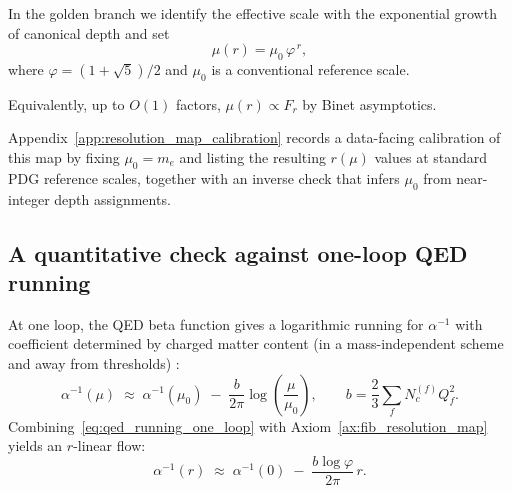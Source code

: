 \begin{axiom}\label{ax:fib_resolution_map}
In the golden branch we identify the effective scale with the exponential growth of canonical depth and set
\begin{equation}
\mu(r)=\mu_0\,\varphi^{\,r},
\end{equation}
where $\varphi=(1+\sqrt{5})/2$ and $\mu_0$ is a conventional reference scale.

Equivalently, up to $O(1)$ factors, $\mu(r)\propto F_r$ by Binet asymptotics.
\end{axiom}

Appendix~\ref{app:resolution_map_calibration} records a data-facing calibration of this map by fixing $\mu_0=m_e$ and listing the resulting $r(\mu)$ values at standard PDG reference scales, together with an inverse check that infers $\mu_0$ from near-integer depth assignments.

\subsection{A quantitative check against one-loop QED running}
At one loop, the QED beta function gives a logarithmic running for $\alpha^{-1}$ with coefficient determined by charged matter content (in a mass-independent scheme and away from thresholds) \cite{GellMannLow1954,PeskinSchroeder1995}:
\begin{equation}\label{eq:qed_running_one_loop}
\alpha^{-1}(\mu)\;\approx\;\alpha^{-1}(\mu_0)\;-\;\frac{b}{2\pi}\log\!\left(\frac{\mu}{\mu_0}\right),\qquad
b=\frac{2}{3}\sum_{f} N_c^{(f)}Q_f^2.
\end{equation}
Combining~\eqref{eq:qed_running_one_loop} with Axiom~\ref{ax:fib_resolution_map} yields an $r$-linear flow:
\begin{equation}\label{eq:qed_running_r}
\alpha^{-1}(r)\;\approx\;\alpha^{-1}(0)\;-\;\frac{b\log\varphi}{2\pi}\,r.
\end{equation}

